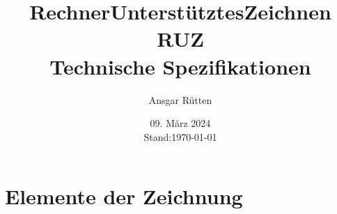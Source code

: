 \documentclass[ngerman]{report}
\title{\textbf{R}echner\textbf{U}nterstütztes\textbf{Z}eichnen RUZ\\Technische Spezifikationen}
\author{Ansgar Rütten}
\date{09. März 2024\\Stand:\today}
\begin{document}
\maketitle
\newpage
\tableofcontents
\newpage
\chapter{Elemente der Zeichnung}


\end{document}
